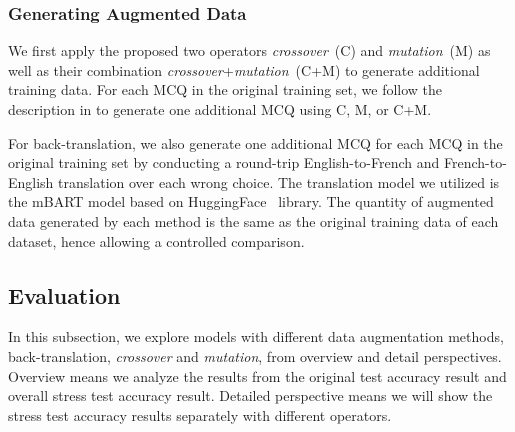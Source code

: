 \subsubsection{Generating Augmented Data}
We first apply the proposed two operators \textit{crossover}~(C) and \textit{mutation}~(M) as well as their combination \textit{crossover}+\textit{mutation}~(C+M) to generate additional training data. For each MCQ in the original training set, we follow the description in  to generate one additional MCQ using C, M, or C+M. 

For back-translation, we also generate one additional MCQ for each MCQ in the original training set by conducting a round-trip English-to-French and French-to-English translation over each wrong choice. The translation model we utilized is the mBART model based on HuggingFace~\cite{wolf-etal-2020-transformers} library. The quantity of augmented data generated by each method is the same as the original training data of each dataset, hence allowing a controlled comparison.

\subsection{Evaluation}
In this subsection, we explore models with different data augmentation methods, 
back-translation, \textit{crossover} and \textit{mutation}, from overview and detail perspectives. 
Overview means we analyze the results from the original test accuracy result and overall stress test accuracy 
result. Detailed perspective means we will show the stress test accuracy results separately with different operators.


